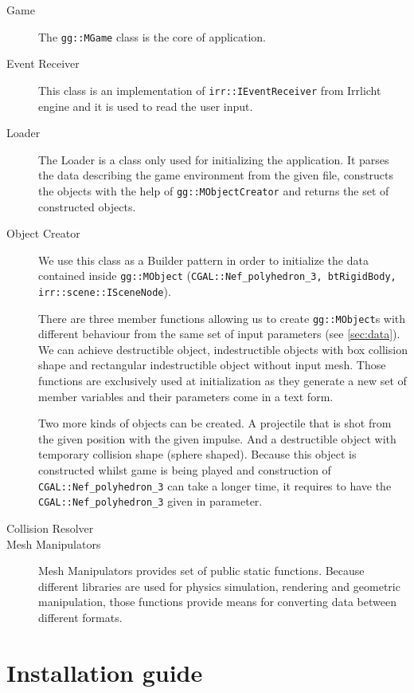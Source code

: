 \begin{description}
\item[Game]
The {\tt gg::MGame} class is the core of application. 

\item[Event Receiver]
This class is an implementation of {\tt irr::IEventReceiver} from Irrlicht engine and it is used to read the user input.

\item[Loader]
The Loader is a class only used for initializing the application. It parses the data describing the game environment from the given file, constructs the objects with the help of {\tt gg::MObjectCreator} and returns the set of constructed objects.

\item[Object Creator]
We use this class as a Builder pattern in order to initialize the data contained inside {\tt gg::MObject} ({\tt CGAL::Nef\_polyhedron\_3, btRigidBody, irr::scene::ISceneNode}).

There are three member functions allowing us to create {\tt gg::MObject}s  with different behaviour from the same set of input parameters (see \cref{sec:data}). We can achieve destructible object, indestructible objects with box collision shape and rectangular indestructible object without input mesh. Those functions are exclusively used at initialization as they generate a new set of member variables and their parameters come in a text form.

Two more kinds of objects can be created. A projectile that is shot from the given position with the given impulse. And a destructible object with temporary collision shape (sphere shaped). Because this object is constructed whilst game is being played and construction of {\tt CGAL::Nef\_polyhedron\_3} can take a longer time, it requires to have the {\tt CGAL::Nef\_polyhedron\_3} given in parameter.

\item[Collision Resolver]

\item[Mesh Manipulators]
Mesh Manipulators provides set of public static functions. Because different libraries are used for physics simulation, rendering and geometric manipulation, those functions provide means for converting data between different formats.
\end{description}



\section{Installation guide}

